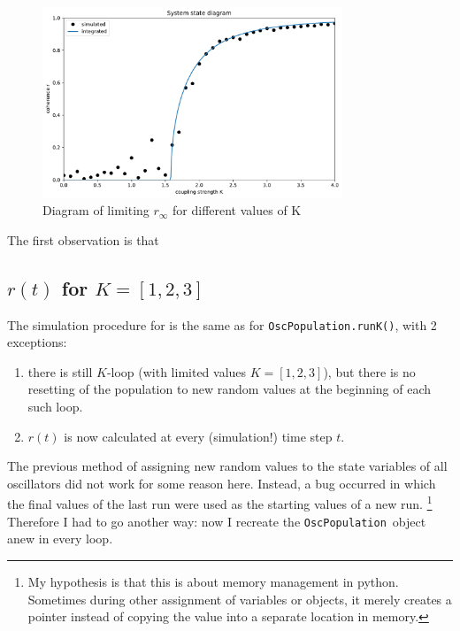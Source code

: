 \documentclass[11pt,a4paper]{article}
\newcommand{\oscpop}{\texttt{OscPopulation}~}
\newcommand{\runK}{\mbox{\texttt{OscPopulation.runK()}}}
\begin{document}
\begin{figure}[H]
	\centering
	\includegraphics[width=0.8\textwidth]{graphics/1_K-vs-r_omegaDistr=normal_N=1000_1611577031.pdf}
	\caption{Diagram of limiting $r_\infty$ for different values of K}
	\label{1}
\end{figure}


The first observation is that 







\clearpage
\subsection{$r(t)$ for $K = [1, 2,3]$} \label{r(t)}

The simulation procedure for is the same as for \runK, with 2 exceptions:
\begin{enumerate}
	\item there is still $K$-loop (with limited values $K = [1,2,3]$), but there is no resetting of the population to new random values at the beginning of each such loop.
	\item $r(t)$ is now calculated at every (simulation!) time step $t$.
\end{enumerate}

The previous method of assigning new random values to the state variables of all oscillators did not work for some reason here. 
Instead, a bug occurred in which the final values of the last run were used as the starting values of a new run.%
	\footnote{My hypothesis is that this is about memory management in python. Sometimes during other assignment of variables or objects, it merely creates a pointer instead of copying the value into a separate location in memory.}
Therefore I had to go another way: now I recreate the \oscpop object anew in every loop. 
\end{document}
